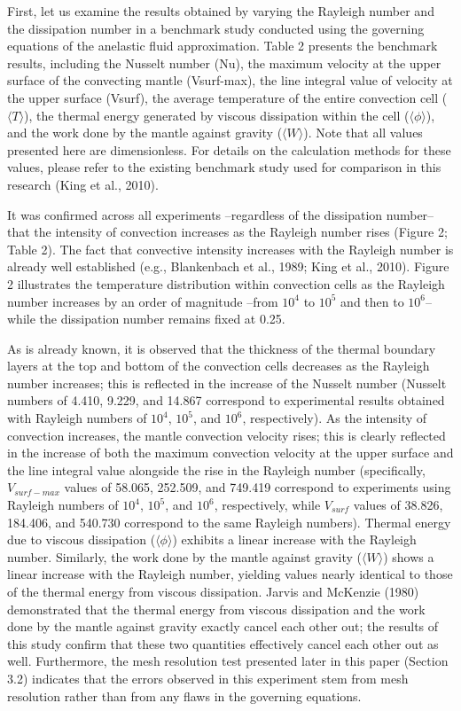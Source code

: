 First, let us examine the results obtained by varying the Rayleigh number and the dissipation number in a benchmark 
study conducted using the governing equations of the anelastic fluid approximation. Table 2 presents the benchmark 
results, including the Nusselt number (Nu), the maximum velocity at the upper surface of the convecting mantle (Vsurf-max), 
the line integral value of velocity at the upper surface (Vsurf), the average temperature of the entire convection 
cell ($\langle T \rangle$), the thermal energy generated by viscous dissipation within the cell ($\langle \phi \rangle$), 
and the work done by the mantle against gravity ($\langle W \rangle$). Note that all values presented here are 
dimensionless. For details on the calculation methods for these values, please refer to the existing benchmark 
study used for comparison in this research (King et al., 2010).

It was confirmed across all experiments --regardless of the dissipation number-- that the intensity of convection increases 
as the Rayleigh number rises (Figure 2; Table 2). The fact that convective intensity increases with the Rayleigh number 
is already well established (e.g., Blankenbach et al., 1989; King et al., 2010). Figure 2 illustrates the 
temperature distribution within convection cells as the Rayleigh number increases by an order of magnitude --from $10^4$ 
to $10^5$ and then to $10^6$-- while the dissipation number remains fixed at 0.25.


As is already known, it is observed that the thickness of the thermal boundary layers at the top and bottom of 
the convection cells decreases as the Rayleigh number increases; this is reflected in the increase of the Nusselt 
number (Nusselt numbers of 4.410, 9.229, and 14.867 correspond to experimental results obtained with Rayleigh numbers 
of $10^4$, $10^5$, and $10^6$, respectively).
As the intensity of convection increases, the mantle convection velocity rises; this is clearly reflected in the 
increase of both the maximum convection velocity at the upper surface and the line integral value alongside the 
rise in the Rayleigh number (specifically, $V_{surf-max}$ values of 58.065, 252.509, and 749.419 correspond to experiments 
using Rayleigh numbers of $10^4$, $10^5$, and $10^6$, respectively, while $V_{surf}$ values of 38.826, 184.406, 
and 540.730 correspond to the same Rayleigh numbers). Thermal energy due to viscous dissipation ($\langle\phi\rangle$) 
exhibits a linear increase with the Rayleigh number. Similarly, the work done by the mantle against gravity ($\langle W\rangle$) 
shows a linear increase with the Rayleigh number, yielding values nearly identical to those of the thermal energy 
from viscous dissipation. Jarvis and McKenzie (1980) demonstrated that the thermal energy from viscous dissipation and 
the work done by the mantle against gravity exactly cancel each other out; the results of this study confirm that 
these two quantities effectively cancel each other out as well. Furthermore, the mesh resolution test presented 
later in this paper (Section 3.2) indicates that the errors observed in this experiment stem from mesh resolution rather than from any flaws in the governing equations.

